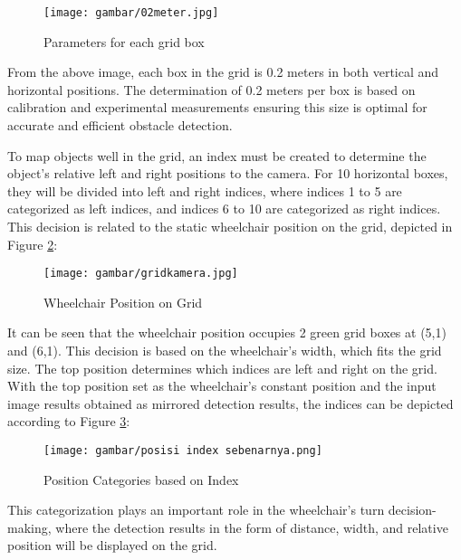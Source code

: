 \begin{figure}[H]
  \centering
  \texttt{[image: gambar/02meter.jpg]}
  \caption{Parameters for each grid box}
  \label{fig:Grid Parameters}
\end{figure}

From the above image, each box in the grid is 0.2 meters in both vertical and horizontal positions. The determination of 0.2 meters per box is based on calibration and experimental measurements ensuring this size is optimal for accurate and efficient obstacle detection.

To map objects well in the grid, an index must be created to determine the object's relative left and right positions to the camera. For 10 horizontal boxes, they will be divided into left and right indices, where indices 1 to 5 are categorized as left indices, and indices 6 to 10 are categorized as right indices. This decision is related to the static wheelchair position on the grid, depicted in Figure \ref{fig:Wheelchair Position on Grid}:

\begin{figure}[H]
  \centering
  \texttt{[image: gambar/gridkamera.jpg]}
  \caption{Wheelchair Position on Grid}
  \label{fig:Wheelchair Position on Grid}
\end{figure}

It can be seen that the wheelchair position occupies 2 green grid boxes at (5,1) and (6,1). This decision is based on the wheelchair's width, which fits the grid size. The top position determines which indices are left and right on the grid. With the top position set as the wheelchair's constant position and the input image results obtained as mirrored detection results, the indices can be depicted according to Figure \ref{fig:Position Categories based on Index}:

\begin{figure}[H]
  \centering
  \texttt{[image: gambar/posisi index sebenarnya.png]}
  \caption{Position Categories based on Index}
  \label{fig:Position Categories based on Index}
\end{figure}

This categorization plays an important role in the wheelchair's turn decision-making, where the detection results in the form of distance, width, and relative position will be displayed on the grid.

